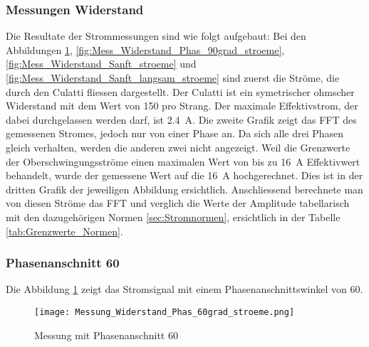 \subsubsection{Messungen Widerstand}

Die Resultate der Strommessungen sind wie folgt aufgebaut: Bei den Abbildungen \ref{fig:Mess_Widerstand_Phas_60grad_stroeme}, \ref{fig:Mess_Widerstand_Phas_90grad_stroeme}, \ref{fig:Mess_Widerstand_Sanft_stroeme} und \ref{fig:Mess_Widerstand_Sanft_langsam_stroeme} sind zuerst die Ströme, die durch den Culatti fliessen dargestellt. Der Culatti ist ein symetrischer ohmscher Widerstand mit dem Wert von \SI{150}{\Omega} pro Strang. Der maximale Effektivstrom, der dabei durchgelassen werden darf, ist \SI{2.4}{A}. Die zweite Grafik zeigt das FFT des gemessenen Stromes, jedoch nur von einer Phase an. Da sich alle drei Phasen gleich verhalten, werden die anderen zwei nicht angezeigt. Weil die Grenzwerte der Oberschwingungsströme einen maximalen Wert von bis zu \SI{16}{A} Effektivwert behandelt, wurde der gemessene Wert auf die \SI{16}{A} hochgerechnet. Dies ist in der dritten Grafik der jeweiligen Abbildung ersichtlich. Anschliessend berechnete man von diesen Ströme das FFT und verglich die Werte der Amplitude tabellarisch mit den dazugehörigen Normen \ref{sec:Stromnormen}, ersichtlich in der Tabelle \ref{tab:Grenzwerte_Normen}.

\subsubsection*{Phasenanschnitt 60\textdegree}

Die Abbildung \ref{fig:Mess_Widerstand_Phas_60grad_stroeme} zeigt das Stromsignal mit einem Phasenanschnittswinkel von 60\textdegree \hspace{0.02cm}. 

\begin{figure}[ht!]
	\centering
	\texttt{[image: Messung\_Widerstand\_Phas\_60grad\_stroeme.png]}	
	\caption{Messung mit Phasenanschnitt 60\textdegree}\label{fig:Mess_Widerstand_Phas_60grad_stroeme}
\end{figure}

